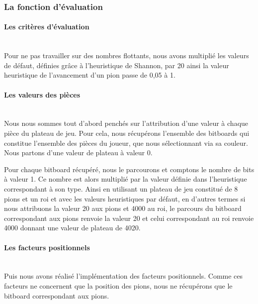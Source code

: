 \huge\documentclass{article}
\begin{document}
\subsubsection{La fonction d'évaluation}\label{heuristique_architecture}
\paragraph{Les critères d'évaluation}
~~\\
\newline
Pour ne pas travailler sur des nombres flottants, nous avons multiplié les valeurs de défaut, définies grâce à l'heuristique de Shannon, par 20 ainsi la valeur heuristique de l'avancement d'un pion passe de 0,05 à 1.

\paragraph{Les valeurs des pièces}
~~\\
\newline
Nous nous sommes tout d'abord penchés sur l'attribution d'une valeur à chaque pièce du plateau de jeu. Pour cela, nous récupérons l'ensemble des bitboards qui constitue l'ensemble des pièces du joueur, que nous sélectionnant via sa couleur. Nous partons d'une valeur de plateau à valeur 0.\newline

Pour chaque bitboard récupéré, nous le parcourons et comptons le nombre de bits à valeur 1. Ce nombre est alors multiplié par la valeur définie dans l'heuristique correspondant à son type. Ainsi en utilisant un plateau de jeu constitué de 8 pions et un roi et avec les valeurs heuristiques par défaut, en d'autres termes si nous attribuons la valeur 20 aux pions et 4000 au roi, le parcours du bitboard correspondant aux pions renvoie la valeur 20 et celui correspondant au roi renvoie 4000 donnant une valeur de plateau de 4020.
\newline
\paragraph{Les facteurs positionnels}
~~\\
\newline
Puis nous avons réalisé l'implémentation des facteurs positionnels.\newline 
Comme ces facteurs ne concernent que la position des pions, nous ne récupérons que le bitboard correspondant aux pions.\newline
\end{document}
